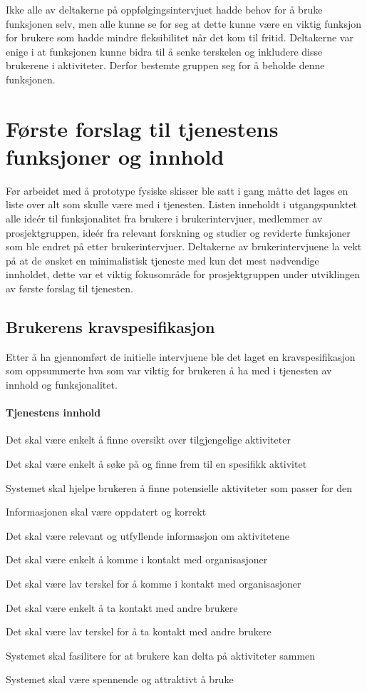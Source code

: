 Ikke alle av deltakerne på oppfølgingsintervjuet hadde behov for å bruke funksjonen selv, men alle kunne se for seg at dette kunne være en viktig funksjon for brukere som hadde mindre fleksibilitet når det kom til fritid. Deltakerne var enige i at funksjonen kunne bidra til å senke terskelen og inkludere disse brukerene i aktiviteter. Derfor bestemte gruppen seg for å beholde denne funksjonen.

\section{Første forslag til tjenestens funksjoner og innhold}

Før arbeidet med å prototype fysiske skisser ble satt i gang måtte det lages en liste over alt som skulle være med i tjenesten. Listen inneholdt i utgangspunktet alle ideér til funksjonalitet fra brukere i brukerintervjuer, medlemmer av prosjektgruppen, ideér fra relevant forskning og studier og reviderte funksjoner som ble endret på etter brukerintervjuer. Deltakerne av brukerintervjuene la vekt på at de ønsket en minimalistisk tjeneste med kun det mest nødvendige innholdet, dette var et viktig fokusområde for prosjektgruppen under utviklingen av første forslag til tjenesten.

\subsection{Brukerens kravspesifikasjon}
\label{section:kravspec}
Etter å ha gjennomført de initielle intervjuene ble det laget en kravspesifikasjon som oppsummerte hva som var viktig for brukeren å ha med i tjenesten av innhold og funksjonalitet.

\paragraph{Tjenestens innhold}
\begin{compactitem}
\item Det skal være enkelt å finne oversikt over tilgjengelige aktiviteter
\item Det skal være enkelt å søke på og finne frem til en spesifikk aktivitet
\item Systemet skal hjelpe brukeren å finne potensielle aktiviteter som passer for den
\item Informasjonen skal være oppdatert og korrekt
\item Det skal være relevant og utfyllende informasjon om aktivitetene
\item Det skal være enkelt å komme i kontakt med organisasjoner
\item Det skal være lav terskel for å komme i kontakt med organisasjoner
\item Det skal være enkelt å ta kontakt med andre brukere
\item Det skal være lav terskel for å ta kontakt med andre brukere
\item Systemet skal fasilitere for at brukere kan delta på aktiviteter sammen
\item Systemet skal være spennende og attraktivt å bruke
\end{compactitem}


